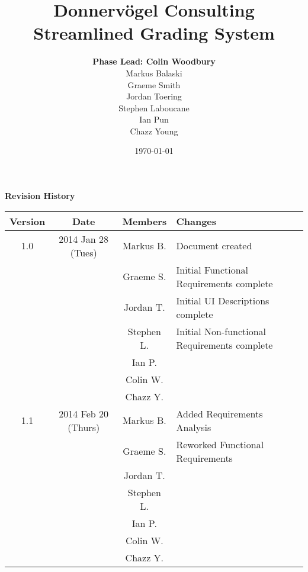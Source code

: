 \documentclass{article}
\begin{document}
\title{Donnervögel Consulting \\ Streamlined Grading System}
\author{\textbf{Phase Lead: Colin Woodbury} \\ Markus Balaski \\ Graeme Smith \\ Jordan Toering 
			\\ Stephen Laboucane \\ Ian Pun \\ Chazz Young}
\date{\today}
\maketitle
\clearpage

\textbf{Revision History}
\begin{center}
  \begin{tabular}{| c | c | c | l |}
    \hline
    Version & Date & Members & Changes\\
    \hline
    1.0 & 2014 Jan 28 (Tues) & Markus B. & Document created\\
    & & Graeme S. & Initial Functional Requirements complete\\
    & & Jordan T. & Initial UI Descriptions complete\\
    & & Stephen L. & Initial Non-functional Requirements complete\\
    & & Ian P. & \\
    & & Colin W. & \\
    & & Chazz Y. & \\
    \hline
    1.1 & 2014 Feb 20 (Thurs) & Markus B. & Added Requirements Analysis\\
    & & Graeme S. & Reworked Functional Requirements\\
    & & Jordan T. & \\
    & & Stephen L. & \\
    & & Ian P. & \\
    & & Colin W. & \\
    & & Chazz Y. & \\
    \hline
  \end{tabular}
\end{center}
\clearpage

\tableofcontents
\clearpage

\end{document}
